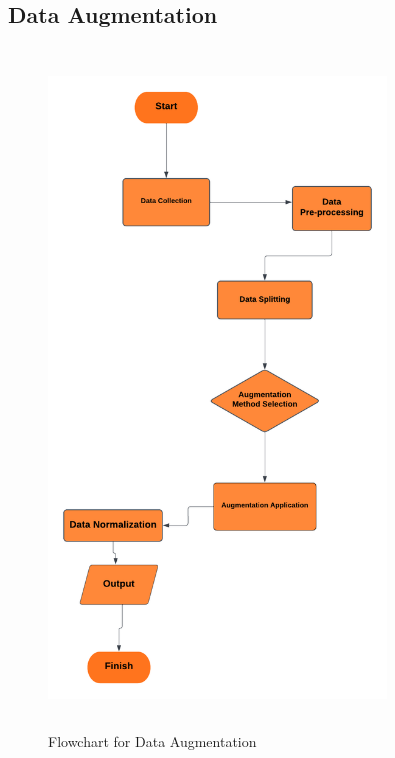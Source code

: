 \subsection{{{\fontsize{14}{19}\selectfont \textbf{Data Augmentation}}}}\cite{rs13234875}
\vspace{1cm}
\begin{figure}[h]
  \centering
  \includegraphics[width=0.8\textwidth,height=18cm]{sections/LBP/Augmentation - Page 1.png}
  \caption{Flowchart for Data Augmentation}
  \label{fig:figure_label}
\end{figure}
\newpage


